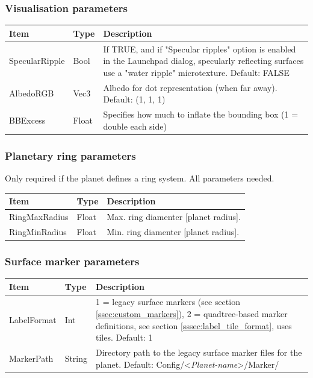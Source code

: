 \documentclass[Orbiter Developer Manual.tex]{subfiles}
\begin{document}
\subsubsection*{Visualisation parameters}
	\begin{longtable}{ |p{}|p{}|p{}| }
	\hline\rule{0pt}{2ex}
	\textbf{Item} & \textbf{Type} & \textbf{Description}\\
	\hline\rule{0pt}{2ex}
	SpecularRipple & Bool & If TRUE, and if "Specular ripples" option is enabled in the Launchpad dialog, specularly reflecting surfaces use a "water ripple" microtexture. Default: FALSE\\
	\hline\rule{0pt}{2ex}
	AlbedoRGB & Vec3 & Albedo for dot representation (when far away). Default: (1, 1, 1)\\
	\hline\rule{0pt}{2ex}
	BBExcess & Float & Specifies how much to inflate the bounding box (1 = double each side)\\
	\hline
	\end{longtable}


\subsubsection*{Planetary ring parameters}
Only required if the planet defines a ring system. All parameters needed.

	\begin{longtable}{ |p{}|p{}|p{}| }
	\hline\rule{0pt}{2ex}
	\textbf{Item} & \textbf{Type} & \textbf{Description}\\
	\hline\rule{0pt}{2ex}
	RingMaxRadius & Float & Max. ring diamenter [planet radius].\\
	\hline\rule{0pt}{2ex}
	RingMinRadius & Float & Min. ring diamenter [planet radius].\\
	\hline
	\end{longtable}


\subsubsection*{Surface marker parameters}
	\begin{longtable}{ |p{}|p{}|p{}| }
	\hline\rule{0pt}{2ex}
	\textbf{Item} & \textbf{Type} & \textbf{Description}\\
	\hline\rule{0pt}{2ex}
	LabelFormat & Int & 1 = legacy surface markers (see section \ref{ssec:custom_markers}), 2 = quadtree-based marker definitions, see section \ref{sssec:label_tile_format}, uses tiles. Default: 1\\
	\hline\rule{0pt}{2ex}
	MarkerPath & String & Directory path to the legacy surface marker files for the planet. Default: Config/<\textit{Planet-name}>/Marker/\\
	\hline
	\end{longtable}
\end{document}
